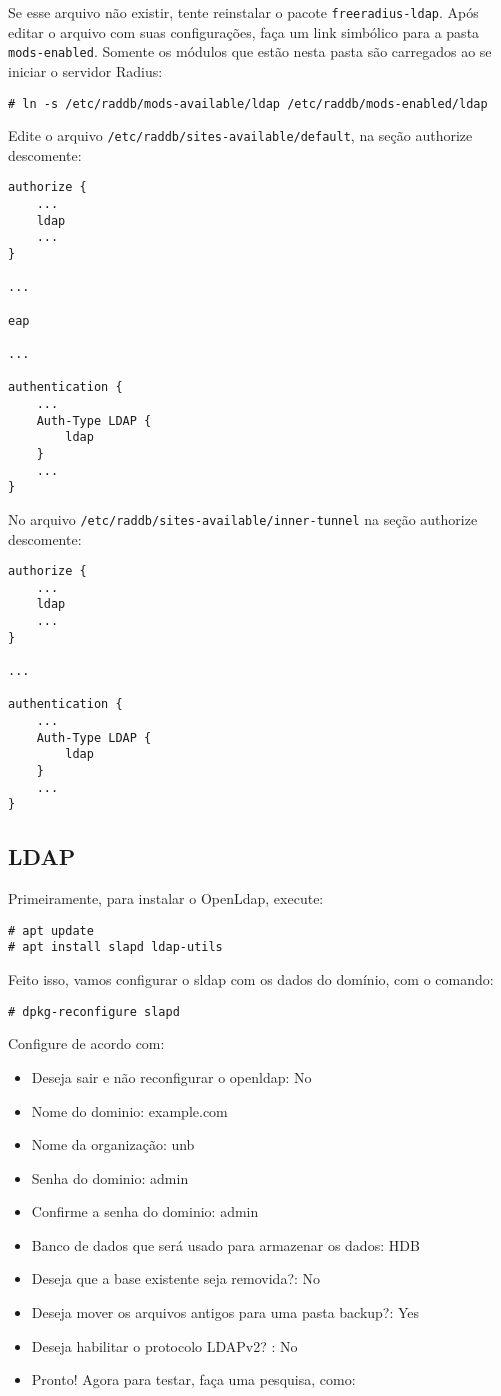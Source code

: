 Se esse arquivo não existir, tente reinstalar o pacote \verb|freeradius-ldap|. Após
editar o arquivo com suas configurações, faça um link simbólico para a pasta
\verb|mods-enabled|. Somente os módulos que estão nesta pasta são carregados ao
se iniciar o servidor Radius:
\begin{verbatim}
# ln -s /etc/raddb/mods-available/ldap /etc/raddb/mods-enabled/ldap
\end{verbatim}


Edite o arquivo \verb|/etc/raddb/sites-available/default|, na seção authorize descomente:
\begin{verbatim}
authorize {
    ...
    ldap
    ...
}

...

eap

...

authentication {
    ...
    Auth-Type LDAP {
        ldap
    }
    ...
}
\end{verbatim}

No arquivo \verb|/etc/raddb/sites-available/inner-tunnel| na seção authorize descomente:

\begin{verbatim}
authorize {
    ...
    ldap
    ...
}

...

authentication {
    ...
    Auth-Type LDAP {
        ldap
    }
    ...
}
\end{verbatim}


\subsection{LDAP}

Primeiramente, para instalar o OpenLdap, execute:
\begin{verbatim}
# apt update
# apt install slapd ldap-utils
\end{verbatim}

Feito isso, vamos configurar o sldap com os dados do domínio, com o comando:

\begin{verbatim}
# dpkg-reconfigure slapd
\end{verbatim}

Configure de acordo com:
\begin{itemize}
    \item Deseja sair e não reconfigurar o openldap: No
    \item Nome do dominio: example.com
    \item Nome da organização: unb
    \item Senha do dominio: admin
    \item Confirme a senha do dominio: admin
    \item Banco de dados que será usado para armazenar os dados: HDB
    \item Deseja que a base existente seja removida?: No
    \item Deseja mover os arquivos antigos para uma pasta backup?: Yes
    \item Deseja habilitar o protocolo LDAPv2? : No
    \item Pronto! Agora para testar, faça uma pesquisa, como:
\end{itemize}

